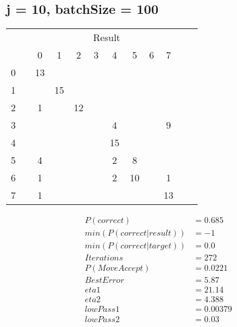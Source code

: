 \documentclass[10pt, conference, compsocconf]{IEEEtran}
\begin{document}
\subsection{j = 10, batchSize = 100}
\begin{center}
\begin{tabular}{l*{10}{c}r}
& & & & & \multicolumn{2}{c}{Result}  & & \\
 &\vline& 0 & 1 & 2 & 3 & 4 & 5 & 6 & 7 \\
\hline
0 &\vline& 13&    &    &    &    &    &    &    \\
 1 &\vline&   &  15&    &    &    &    &    &    \\
 2 &\vline&  1&    &  12&    &    &    &    &    \\
 3 &\vline&   &    &    &    &   4&    &    &   9 \\
 4 &\vline&   &    &    &    &  15&    &    &    \\
 5 &\vline&  4&    &    &    &   2&   8&    &    \\
 6 &\vline&  1&    &    &    &   2&  10&    &   1 \\
 7 &\vline&  1&    &    &    &    &    &    &  13 \\
\end{tabular}
\begin{align}
P( correct )  &=  0.685\\
min( P( correct |  result  ) )  &=   -1\\
min( P( correct | target ) )  &=   0.0\\
Iterations &=   272\\
P(Move Accept) &=   0.0221\\
Best Error &=   5.87\\
eta1    &=    21.14\\
eta2     &=   4.388\\
lowPass1 &=   0.00379\\
lowPass2  &=  0.03
\end{align}
\end{center}
\end{document}
